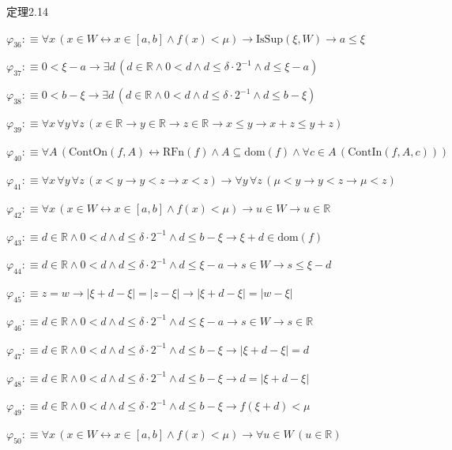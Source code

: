 \begin{fullproof}{定理2.14}
\begin{abbrevlist}
\item $\varphi_{36} :\equiv \forall x\,(x \in W \leftrightarrow x \in [a,b] \land f(x) < \mu) \to \mathrm{IsSup}(\xi,W) \to a \leq \xi$
\item $\varphi_{37} :\equiv 0 < \xi - a \to \exists d\,(d \in \mathbb{R} \land 0 < d \land d \leq \delta \cdot 2^{-1} \land d \leq \xi - a)$
\item $\varphi_{38} :\equiv 0 < b - \xi \to \exists d\,(d \in \mathbb{R} \land 0 < d \land d \leq \delta \cdot 2^{-1} \land d \leq b - \xi)$
\item $\varphi_{39} :\equiv \forall x\,\forall y\,\forall z\,(x \in \mathbb{R} \to y \in \mathbb{R} \to z \in \mathbb{R} \to x \leq y \to x + z \leq y + z)$
\item $\varphi_{40} :\equiv \forall A\,(\mathrm{ContOn}(f,A) \leftrightarrow \mathrm{RFn}(f) \land A \subseteq \mathrm{dom}(f) \land \forall c \in A\,(\mathrm{ContIn}(f,A,c)))$
\item $\varphi_{41} :\equiv \forall x\,\forall y\,\forall z\,(x < y \to y < z \to x < z) \to \forall y\,\forall z\,(\mu < y \to y < z \to \mu < z)$
\item $\varphi_{42} :\equiv \forall x\,(x \in W \leftrightarrow x \in [a,b] \land f(x) < \mu) \to u \in W \to u \in \mathbb{R}$
\item $\varphi_{43} :\equiv d \in \mathbb{R} \land 0 < d \land d \leq \delta \cdot 2^{-1} \land d \leq b - \xi \to \xi + d \in \mathrm{dom}(f)$
\item $\varphi_{44} :\equiv d \in \mathbb{R} \land 0 < d \land d \leq \delta \cdot 2^{-1} \land d \leq \xi - a \to s \in W \to s \leq \xi - d$
\item $\varphi_{45} :\equiv z = w \to \lvert \xi + d - \xi \rvert = \lvert z - \xi \rvert \to \lvert \xi + d - \xi \rvert = \lvert w - \xi \rvert$
\item $\varphi_{46} :\equiv d \in \mathbb{R} \land 0 < d \land d \leq \delta \cdot 2^{-1} \land d \leq \xi - a \to s \in W \to s \in \mathbb{R}$
\item $\varphi_{47} :\equiv d \in \mathbb{R} \land 0 < d \land d \leq \delta \cdot 2^{-1} \land d \leq b - \xi \to \lvert \xi + d - \xi \rvert = d$
\item $\varphi_{48} :\equiv d \in \mathbb{R} \land 0 < d \land d \leq \delta \cdot 2^{-1} \land d \leq b - \xi \to d = \lvert \xi + d - \xi \rvert$
\item $\varphi_{49} :\equiv d \in \mathbb{R} \land 0 < d \land d \leq \delta \cdot 2^{-1} \land d \leq b - \xi \to f(\xi + d) < \mu$
\item $\varphi_{50} :\equiv \forall x\,(x \in W \leftrightarrow x \in [a,b] \land f(x) < \mu) \to \forall u \in W\,(u \in \mathbb{R})$

\end{abbrevlist}
\end{fullproof}
